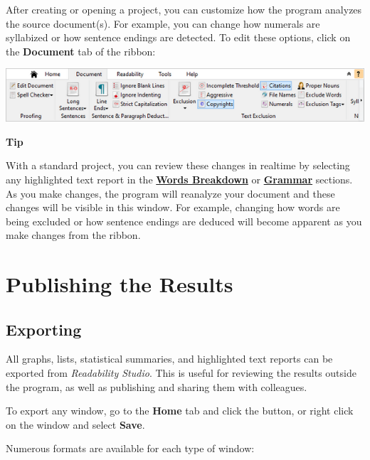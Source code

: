 \documentclass[
]{book}
\newenvironment{tipsection}
    {
    \begin{tcolorbox}[colframe=lightgray,colback=lightyellow,arc=3mm]
    \faLightbulb[regular] \textbf{Tip} \newline
    }
    {
    \end{tcolorbox}
    }
\theoremstyle{definition}
\theoremstyle{definition}
\theoremstyle{definition}
\theoremstyle{definition}
\theoremstyle{remark}
\begin{document}
After creating or opening a project, you can customize how the program analyzes the source document(s). For example, you can change how numerals are syllabized or how sentence endings are detected. To edit these options, click on the \textbf{Document} tab of the ribbon:

\includegraphics{Images/RibbonEditDocumentOptions.png}

\begin{tipsection}
With a standard project, you can review these changes in realtime by selecting any highlighted text report in the \protect\hyperlink{reviewing-word-breakdowns}{\textbf{Words Breakdown}} or \protect\hyperlink{reviewing-standard-grammar}{\textbf{Grammar}} sections. As you make changes, the program will reanalyze your document and these changes will be visible in this window. For example, changing how words are being excluded or how sentence endings are deduced will become apparent as you make changes from the ribbon.

\end{tipsection}

\hypertarget{publishing-the-results}{%
\chapter{Publishing the Results}\label{publishing-the-results}}

\hypertarget{exporting}{%
\section{Exporting}\label{exporting}}

All graphs, lists, statistical summaries, and highlighted text reports can be exported from \emph{Readability Studio}. This is useful for reviewing the results outside the program, as well as publishing and sharing them with colleagues.

To export any window, go to the \textbf{Home} tab and click the  button, or right click on the window and select \textbf{Save}.

Numerous formats are available for each type of window:
\end{document}
